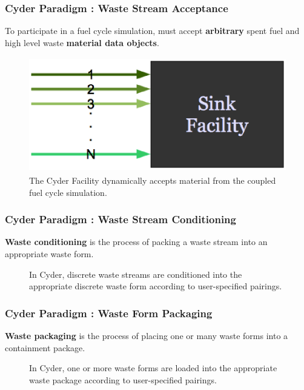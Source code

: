 \begin{frame}[ctb!]
  \frametitle{Cyder Paradigm : Waste Stream Acceptance}
To participate in a \Cyclus fuel cycle simulation, \Cyder must accept 
\textbf{arbitrary} spent fuel and high level waste \textbf{material data 
objects}.
  \begin{figure}[htbp!]
    \begin{center}
      \includegraphics[height=5cm]{./images/sinkfacility.eps}
    \end{center}
    \caption{ The Cyder Facility dynamically accepts material from the coupled 
    fuel cycle simulation.} 
    \label{fig:sinkfacility}
  \end{figure}
\end{frame}

\begin{frame}[ctb!]
  \frametitle{Cyder Paradigm : Waste Stream Conditioning}
  \footnotesize{

    \textbf{Waste conditioning} is the process of packing a waste stream into an appropriate 
waste form. 
  
\begin{figure}[htbp!]
\begin{center}
\def\svgwidth{.5\textwidth}

\end{center}
\caption{In Cyder, discrete waste streams are conditioned into the appropriate 
discrete waste form according to user-specified pairings.}
\label{fig:ws_conditioning}
\end{figure}
}
\end{frame}

\begin{frame}[ctb!]
  \frametitle{Cyder Paradigm : Waste Form Packaging}
  \footnotesize{

    \textbf{Waste packaging} is the process of placing one or many waste forms into a 
containment package. 

\begin{figure}[htbp!]
\begin{center}
\def\svgwidth{.5\textwidth}

\end{center}
\caption{In Cyder, one or more waste forms are loaded into the appropriate 
waste package according to user-specified pairings.}
\label{fig:wf_packaging}
\end{figure}
}
\end{frame}

